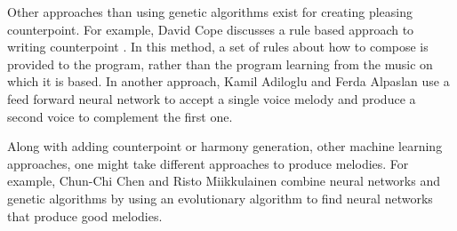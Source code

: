 Other approaches than using genetic algorithms exist for creating pleasing counterpoint.
For example, David Cope discusses a rule based approach to writing counterpoint \cite{cope_computers_1991}.
In this method, a set of rules about how to compose is provided to the program, rather than the program learning from the music on which it is based.
In another approach, Kamil Adiloglu and Ferda Alpaslan \cite{adiloglu_machine_2007} use a feed forward neural network to accept a single voice melody and produce a second voice to complement the first one.

Along with adding counterpoint or harmony generation, other machine learning approaches, one might take different approaches to produce melodies.
For example, Chun-Chi Chen and Risto Miikkulainen \cite{chen_creating_2001} combine neural networks and genetic algorithms by using an evolutionary algorithm to find neural networks that produce good melodies.

